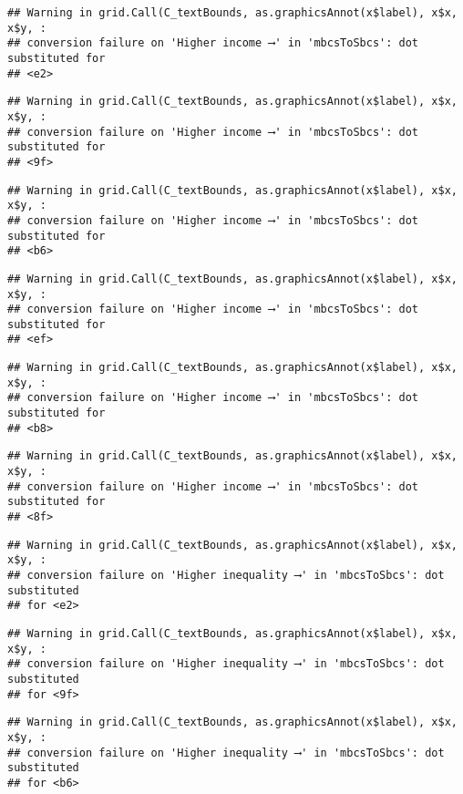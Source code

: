\documentclass[
]{article}
\begin{document}
\begin{verbatim}
## Warning in grid.Call(C_textBounds, as.graphicsAnnot(x$label), x$x, x$y, :
## conversion failure on 'Higher income ⟶️' in 'mbcsToSbcs': dot substituted for
## <e2>
\end{verbatim}

\begin{verbatim}
## Warning in grid.Call(C_textBounds, as.graphicsAnnot(x$label), x$x, x$y, :
## conversion failure on 'Higher income ⟶️' in 'mbcsToSbcs': dot substituted for
## <9f>
\end{verbatim}

\begin{verbatim}
## Warning in grid.Call(C_textBounds, as.graphicsAnnot(x$label), x$x, x$y, :
## conversion failure on 'Higher income ⟶️' in 'mbcsToSbcs': dot substituted for
## <b6>
\end{verbatim}

\begin{verbatim}
## Warning in grid.Call(C_textBounds, as.graphicsAnnot(x$label), x$x, x$y, :
## conversion failure on 'Higher income ⟶️' in 'mbcsToSbcs': dot substituted for
## <ef>
\end{verbatim}

\begin{verbatim}
## Warning in grid.Call(C_textBounds, as.graphicsAnnot(x$label), x$x, x$y, :
## conversion failure on 'Higher income ⟶️' in 'mbcsToSbcs': dot substituted for
## <b8>
\end{verbatim}

\begin{verbatim}
## Warning in grid.Call(C_textBounds, as.graphicsAnnot(x$label), x$x, x$y, :
## conversion failure on 'Higher income ⟶️' in 'mbcsToSbcs': dot substituted for
## <8f>
\end{verbatim}

\begin{verbatim}
## Warning in grid.Call(C_textBounds, as.graphicsAnnot(x$label), x$x, x$y, :
## conversion failure on 'Higher inequality ⟶️' in 'mbcsToSbcs': dot substituted
## for <e2>
\end{verbatim}

\begin{verbatim}
## Warning in grid.Call(C_textBounds, as.graphicsAnnot(x$label), x$x, x$y, :
## conversion failure on 'Higher inequality ⟶️' in 'mbcsToSbcs': dot substituted
## for <9f>
\end{verbatim}

\begin{verbatim}
## Warning in grid.Call(C_textBounds, as.graphicsAnnot(x$label), x$x, x$y, :
## conversion failure on 'Higher inequality ⟶️' in 'mbcsToSbcs': dot substituted
## for <b6>
\end{verbatim}
\end{document}
